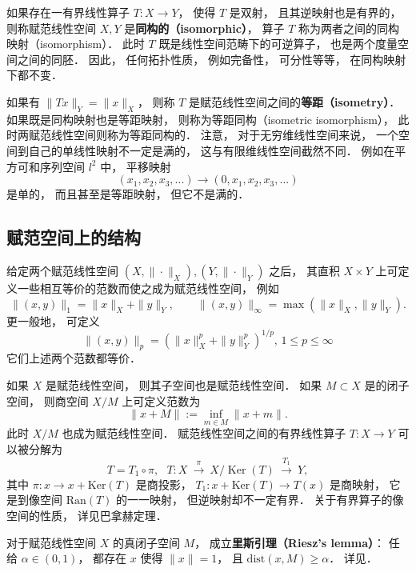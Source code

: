 如果存在一有界线性算子 $T:X\to Y$， 使得 $T$ 是双射， 且其逆映射也是有界的， 则称赋范线性空间 $X,Y$ 是\textbf{同构的（isomorphic）}， 算子 $T$ 称为两者之间的同构映射（isomorphism）． 此时 $T$ 既是线性空间范畴下的可逆算子， 也是两个度量空间之间的同胚． 因此， 任何拓扑性质， 例如完备性， 可分性等等， 在同构映射下都不变． 

如果有 $\|Tx\|_Y=\|x\|_X$， 则称 $T$ 是赋范线性空间之间的\textbf{等距（isometry）}． 如果既是同构映射也是等距映射， 则称为等距同构（isometric isomorphism）， 此时两赋范线性空间则称为等距同构的． 注意， 对于无穷维线性空间来说， 一个空间到自己的单线性映射不一定是满的， 这与有限维线性空间截然不同． 例如在平方可和序列空间 $l^2$ 中， 平移映射
$$
(x_1,x_2,x_3,...)\to(0,x_1,x_2,x_3,...)
$$
是单的， 而且甚至是等距映射， 但它不是满的．

\subsection{赋范空间上的结构}
给定两个赋范线性空间 $(X,\|\cdot\|_X),(Y,\|\cdot\|_Y)$ 之后， 其直积 $X\times Y$ 上可定义一些相互等价的范数而使之成为赋范线性空间， 例如
$$
\|(x,y)\|_{1}=\|x\|_X+\|y\|_Y,\qquad \|(x,y)\|_{\infty }=\max(\|x\|_X,\|y\|_Y).
$$
更一般地， 可定义
$$
\|(x,y)\|_{p}=\left(\|x\|_X^p+\|y\|_Y^p\right)^{1/p},\,1\leq p\leq\infty
$$
它们上述两个范数都等价．

如果 $X$ 是赋范线性空间， 则其子空间也是赋范线性空间． 如果 $M\subset X$ 是的闭子空间， 则商空间 $X/M$ 上可定义范数为
$$
\|x+M\|:=\inf \limits _{m\in M}\|x+m\|.
$$
此时 $X/M$ 也成为赋范线性空间． 赋范线性空间之间的有界线性算子 $T:X\to Y$ 可以被分解为
$$
T=T_{1}\circ \pi ,\ \ \ T:X\ {\overset {\pi }{\longrightarrow }}\ X/\operatorname {Ker} (T)\ {\overset {T_{1}}{\longrightarrow }}\ Y,
$$
其中 $\pi:x\to x+\text{Ker}(T)$ 是商投影， $T_1:x+\text{Ker}(T)\to T(x)$ 是商映射， 它是到像空间 $\text{Ran}(T)$ 的一一映射， 但逆映射却不一定有界． 关于有界算子的像空间的性质， 详见巴拿赫定理． %

对于赋范线性空间 $X$ 的真闭子空间 $M$， 成立\textbf{里斯引理（Riesz's lemma）}： 任给 $\alpha\in(0,1)$， 都存在 $x$ 使得 $\|x\|=1$， 且 $\text{dist}(x,M)\geq\alpha$． 详见．
